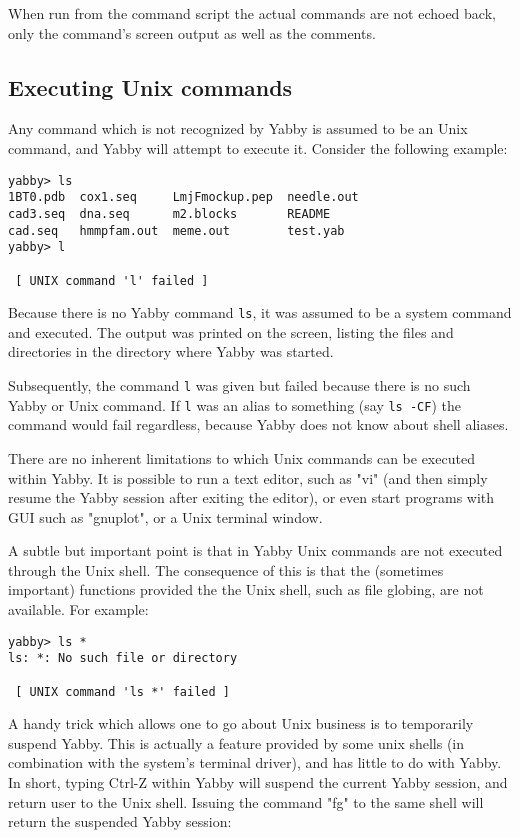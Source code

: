 When run from the command script the actual commands are not
echoed back, only the command's screen output as well as the
comments.

\subsection{Executing Unix commands}


Any command which is not recognized by Yabby is assumed to be
an Unix command, and Yabby will attempt to execute it. Consider
the following example:

\begin{verbatim}
yabby> ls
1BT0.pdb  cox1.seq     LmjFmockup.pep  needle.out
cad3.seq  dna.seq      m2.blocks       README
cad.seq   hmmpfam.out  meme.out        test.yab
yabby> l

 [ UNIX command 'l' failed ]
\end{verbatim}

Because there is no Yabby command {\tt ls}, it was assumed to
be a system command and executed.  The output was printed on
the screen, listing the files and directories in the directory
where Yabby was started.

Subsequently, the command {\tt l} was given but failed because
there is no such Yabby or Unix command. If {\tt l} was an alias
to something (say {\tt ls -CF}) the command would fail regardless,
because Yabby does not know about shell aliases.

There are no inherent limitations to which Unix commands can be
executed within Yabby. It is possible to run a text editor, such
as "vi" (and then simply resume the Yabby session after exiting
the editor), or even start programs with GUI such as "gnuplot",
or a Unix terminal window.

A subtle but important point is that in Yabby Unix commands are
not executed through the Unix shell.  The consequence of this
is that the (sometimes important) functions provided the the
Unix shell, such as file globing, are not available. For example:

\begin{verbatim}
yabby> ls *
ls: *: No such file or directory

 [ UNIX command 'ls *' failed ]
\end{verbatim}

A handy trick which allows one to go about Unix business is
to temporarily suspend Yabby. This is actually a feature provided
by some unix shells (in combination with the system's terminal driver),
and has little to do with Yabby. In short, typing Ctrl-Z within
Yabby will suspend the current Yabby session, and return user
to the Unix shell. Issuing the command "fg" to the same shell
will return the suspended Yabby session:

